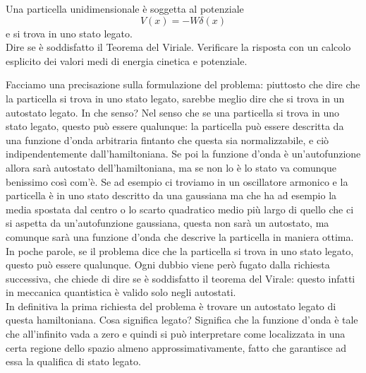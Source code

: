 \begin{esercizio}[(08/07/2019 n°2)]
   Una particella unidimensionale è soggetta al potenziale
   \begin{equation*}
      V(x)=-W\delta(x)
   \end{equation*}
   e si trova in uno stato legato.\\
   Dire se è soddisfatto il Teorema del Viriale. Verificare la risposta con un calcolo esplicito dei valori medi di energia cinetica e potenziale.
\end{esercizio}
\begin{soluzione}
   Facciamo una precisazione sulla formulazione del problema: piuttosto che dire che la particella si trova in uno stato legato, sarebbe meglio dire che si trova in un autostato legato. In che senso? Nel senso che se una particella si trova in uno stato legato, questo può essere qualunque: la particella può essere descritta da una funzione d'onda arbitraria fintanto che questa sia normalizzabile, e ciò indipendentemente dall'hamiltoniana. Se poi la funzione d'onda è un'autofunzione allora sarà autostato dell'hamiltoniana, ma se non lo è lo stato va comunque benissimo così com'è. Se ad esempio ci troviamo in un oscillatore armonico e la particella è in uno stato descritto da una gaussiana ma che ha ad esempio la media spostata dal centro o lo scarto quadratico medio più largo di quello che ci si aspetta da un'autofunzione gaussiana, questa non sarà un autostato, ma comunque sarà una funzione d'onda che descrive la particella in maniera ottima.\\
   In poche parole, se il problema dice che la particella si trova in uno stato legato, questo può essere qualunque. Ogni dubbio viene però fugato dalla richiesta successiva, che chiede di dire se è soddisfatto il teorema del Virale: questo infatti in meccanica quantistica è valido solo negli autostati.\\
   In definitiva la prima richiesta del problema è trovare un autostato legato di questa hamiltoniana. Cosa significa legato? Significa che la funzione d'onda è tale che all'infinito vada a zero e quindi si può interpretare come localizzata in una certa regione dello spazio almeno approssimativamente, fatto che garantisce ad essa la qualifica di stato legato.\\

\end{soluzione}

